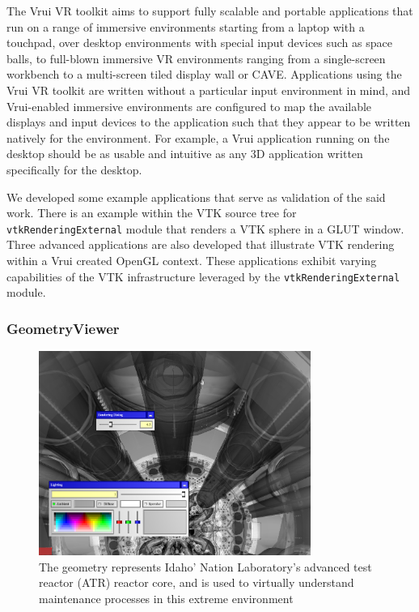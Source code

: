 The Vrui VR toolkit aims to support fully scalable and portable applications that run on a range of immersive environments starting from a laptop with a touchpad, over desktop environments with special input devices such as space balls, to full-blown immersive VR environments ranging from a single-screen workbench to a multi-screen tiled display wall or CAVE. Applications using the Vrui VR toolkit are written without a particular input environment in mind, and Vrui-enabled immersive environments are configured to map the available displays and input devices to the application such that they appear to be written natively for the environment. For example, a Vrui application running on the desktop should be as usable and intuitive as any 3D application written specifically for the desktop.

We developed some example applications that serve as validation of the said work. There is an example within the VTK source tree for \texttt{vtkRenderingExternal} module that renders a VTK sphere in a GLUT window. Three advanced applications are also developed that illustrate VTK rendering within a Vrui created OpenGL context. These applications exhibit varying capabilities of the VTK infrastructure leveraged by the \texttt{vtkRenderingExternal} module. 

\subsubsection{GeometryViewer}

\begin{figure}[h!]
 \centering
 \includegraphics[width=3.5in]{images/vessel.png}
 \caption{The geometry represents Idaho' Nation Laboratory's advanced test reactor (ATR) reactor core, and is used to virtually understand maintenance processes in this extreme environment}
 \label{fig:vessel}
\end{figure}

